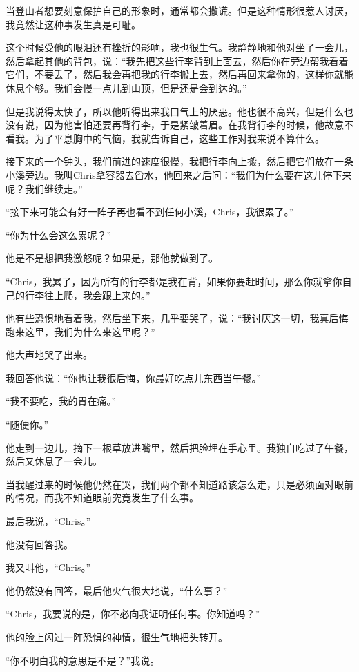 \documentclass[UTF8]{article}
\begin{document}
\par 当登山者想要刻意保护自己的形象时，通常都会撒谎。但是这种情形很惹人讨厌，我竟然让这种事发生真是可耻。
\par 这个时候受他的眼泪还有挫折的影响，我也很生气。我静静地和他对坐了一会儿，然后拿起其他的背包，说：“我先把这些行李背到上面去，然后你在旁边帮我看着它们，不要丢了，然后我会再把我的行李搬上去，然后再回来拿你的，这样你就能休息个够。我们会慢一点儿到山顶，但是还是会到达的。”
\par 但是我说得太快了，所以他听得出来我口气上的厌恶。他也很不高兴，但是什么也没有说，因为他害怕还要再背行李，于是紧皱着眉。在我背行李的时候，他故意不看我。为了平息胸中的气恼，我就告诉自己，这些工作对我来说不算什么。
\par 接下来的一个钟头，我们前进的速度很慢，我把行李向上搬，然后把它们放在一条小溪旁边。我叫Chris拿容器去舀水，他回来之后问：“我们为什么要在这儿停下来呢？我们继续走。”
\par “接下来可能会有好一阵子再也看不到任何小溪，Chris，我很累了。”
\par “你为什么会这么累呢？”
\par 他是不是想把我激怒呢？如果是，那他就做到了。
\par “Chris，我累了，因为所有的行李都是我在背，如果你要赶时间，那么你就拿你自己的行李往上爬，我会跟上来的。”
\par 他有些恐惧地看着我，然后坐下来，几乎要哭了，说：“我讨厌这一切，我真后悔跑来这里，我们为什么来这里呢？”
\par 他大声地哭了出来。
\par 我回答他说：“你也让我很后悔，你最好吃点儿东西当午餐。”
\par “我不要吃，我的胃在痛。”
\par “随便你。”
\par 他走到一边儿，摘下一根草放进嘴里，然后把脸埋在手心里。我独自吃过了午餐，然后又休息了一会儿。
\par 当我醒过来的时候他仍然在哭，我们两个都不知道路该怎么走，只是必须面对眼前的情况，而我不知道眼前究竟发生了什么事。
\par 最后我说，“Chris。”
\par 他没有回答我。
\par 我又叫他，“Chris。”
\par 他仍然没有回答，最后他火气很大地说，“什么事？”
\par “Chris，我要说的是，你不必向我证明任何事。你知道吗？”
\par 他的脸上闪过一阵恐惧的神情，很生气地把头转开。
\par “你不明白我的意思是不是？”我说。
\end{document}
